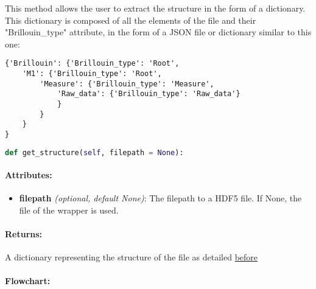 This method allows the user to extract the structure in the form of a dictionary. This dictionary is composed of all the elements of the file and their "Brillouin\_type" attribute, in the form of a JSON file or dictionary similar to this one:
\begin{verbatim}
{'Brillouin': {'Brillouin_type': 'Root', 
    'M1': {'Brillouin_type': 'Root', 
        'Measure': {'Brillouin_type': 'Measure', 
            'Raw_data': {'Brillouin_type': 'Raw_data'}
            }
        }
    }
}
\end{verbatim}

\begin{lstlisting}[language=Python]
def get_structure(self, filepath = None):
\end{lstlisting}

\paragraph{Attributes:}

\begin{itemize}
    \item \textbf{filepath} \textit{(optional, default None)}: The filepath to a HDF5 file. If None, the file of the wrapper is used.
\end{itemize}

\paragraph{Returns:} A dictionary representing the structure of the file as detailed \hyperref[subsec:preamble.file_structure.complete_structure]{before}

\paragraph{Flowchart:}

